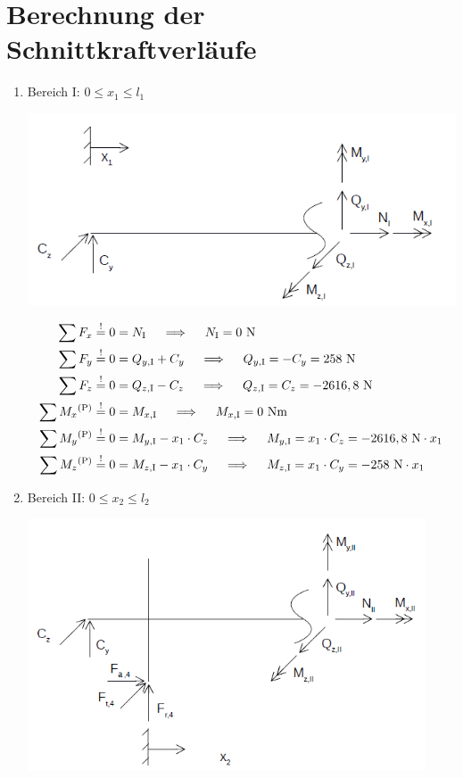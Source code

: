 \section{Berechnung der Schnittkraftverläufe}
\renewcommand{\labelenumi}{\roman{enumi})}
\begin{enumerate}
\item Bereich I: $0 \leq x_1 \leq l_1$
\begin{center}
	\includegraphics[width=1.04\textwidth,keepaspectratio]{figures/Bereich1.png}
\end{center}
    \begin{align*}
        \sum F_x &\overset{!}{=} 0 = N_{\mathrm{I}} \quad \implies \quad  N_{\mathrm{I}} = 0 \text{ N}\\ 
        \sum F_y &\overset{!}{=} 0 =  Q_{y,\mathrm{I}} + C_y \quad \implies \quad  Q_{y,\mathrm{I}} = -C_y = 258\text{ N}\\
        \sum F_z &\overset{!}{=} 0 =  Q_{z,\mathrm{I}} - C_z \quad \implies \quad  Q_{z,\mathrm{I}} = C_z = -2616,8\text{ N}\\
        \sum M_x \textsuperscript{(P)}&\overset{!}{=} 0 = M_{x,\mathrm{I}} \quad \implies \quad   M_{x,\mathrm{I}} = 0 \text{ Nm} \\ 
        \sum M_y \textsuperscript{(P)}&\overset{!}{=} 0 = M_{y,\mathrm{I}} - x_1 \cdot C_z \quad \implies \quad   M_{y,\mathrm{I}} =x_1 \cdot C_z =-2616,8 \text{ N} \cdot x_1\\ 
        \sum M_z \textsuperscript{(P)}&\overset{!}{=} 0 = M_{z,\mathrm{I}} -x_1 \cdot C_y  \quad \implies \quad   M_{z,\mathrm{I}} = x_1 \cdot C_y = -258 \text{ N} \cdot x_1 \\ 
    \end{align*}
\newpage
\item Bereich II: $0 \leq x_2 \leq l_2$
\begin{center}
	\includegraphics[width=0.93\textwidth,keepaspectratio]{figures/Bereich2.png}

\end{center}
\end{enumerate}
